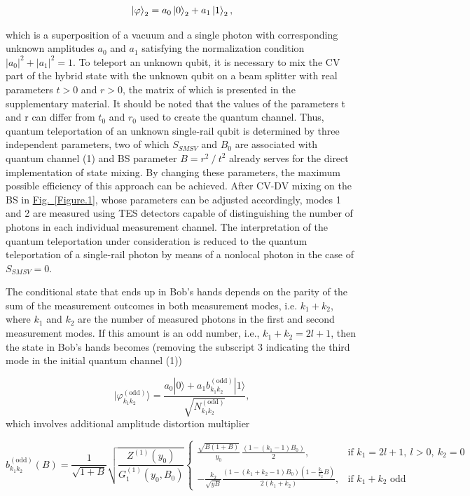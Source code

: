 \documentclass{optica-article}
\begin{document}
\begin{equation}\label{eq:2}
    \ket{\varphi}_{2} =
    a_0
    \ket{0}_2 +
    a_1\ket{1}_2,
\end{equation}


\!\!\!\!\!\!which is a superposition of a vacuum and a single photon with corresponding unknown amplitudes $a_0$ and $a_1$ satisfying the normalization condition $\lvert{a_0}\rvert^2+\lvert{a_1}\rvert^2=1$. To teleport an unknown qubit, it is necessary to mix the CV part of the hybrid state with the unknown qubit on a beam splitter with real parameters $t>0$ and $r>0$, the matrix of which is presented in the supplementary material. It should be noted that the values of the parameters t and r can differ from $t_0$ and $r_0$ used to create the quantum channel. Thus, quantum teleportation of an unknown single-rail qubit is determined by three independent parameters, two of which $S_{SMSV}$ and $B_0$ are associated with quantum channel (1) and BS parameter $B=r^2⁄t^2$  already serves for the direct implementation of state mixing.
By changing these parameters, the maximum possible efficiency of this approach can be achieved. After CV-DV mixing on the BS in \hyperref[Figure.1]{Fig.~\ref*{Figure.1}}, whose parameters can be adjusted accordingly, modes 1 and 2 are measured using TES detectors \cite{40,41} capable of distinguishing the number of photons in each individual measurement channel. The interpretation of the quantum teleportation under consideration is reduced to the quantum teleportation of a single-rail photon by means of a nonlocal photon \cite{15,16} in the case of $S_{SMSV}=0$.
\par The conditional state that ends up in Bob's hands depends on the parity of the sum of the measurement outcomes in both measurement modes, i.e. $k_1+k_2$, where $k_1$ and $k_2$ are the number of measured photons in the first and second measurement modes. If this amount is an odd number, i.e., $k_1+k_2=2l+1$, then the state in Bob's hands becomes (removing the subscript 3 indicating the third mode in the initial quantum channel (1))


\begin{equation}\label{eq:3}
		|\varphi_{k_1 k_2}^{(\text{odd})}\rangle = \frac{a_0 |0\rangle + a_1b_{k_1 k_2}^{(\text{odd})} |1\rangle}{\sqrt{N_{k_1 k_2}^{(\text{odd})}}},
\end{equation}
which involves additional amplitude distortion multiplier  

\begin{equation}\label{eq:4}
		b_{k_1 k_2}^{(\text{odd})}(B) = \frac{1}{\sqrt{1+B}} \sqrt{\frac{Z^{(1)}(y_0)}{G_1^{(1)}(y_0,B_0)}} 
		\begin{cases}
			\frac{\sqrt{B(1+B)}}{y_0}\,\frac{(1-(k_1-1)B_0)}{2} , & \!\!\!\!\!\!\!\!\!\!\!\!\!\!\!\!\!\!\!\!\!
            \text{if } k_1 = 2l+1,\ l>0,\ k_2 = 0 \\[3ex]
			-\frac{k_2}{\sqrt{yB}}\frac{(1-(k_1+k_2-1)B_0)(1-\frac{k_1}{k_2}B)}{2(k_1+k_2)}, & \!\!\!\!\text{if } k_1+k_2 \text{ odd}
		\end{cases}
\end{equation}
\end{document}
